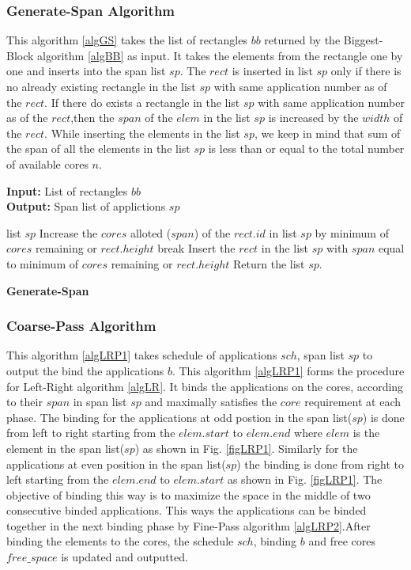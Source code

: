 \documentclass[10pt, conference]{IEEEtran}
\begin{document}
\subsubsection{Generate-Span Algorithm}
This algorithm \ref{algGS} takes the list of rectangles $bb$ returned by the Biggest-Block algorithm \ref{algBB} as input. It takes the elements from the rectangle one by one and inserts into the span list $sp$. The $rect$ is inserted in list $sp$ only if there is no already existing rectangle in the list $sp$ with same application number as of the $rect$. If there do exists a rectangle in the list $sp$ with same application number as of the $rect$,then the $span$ of the $elem$ in the list $sp$ is increased by the $width$ of the $rect$. While inserting the elements in the list $sp$, we keep in mind that sum of the span of all the elements in the list $sp$ is less than or equal to the total number of available cores $n$. 

\begin{algorithm}[tb]
\footnotesize
\textbf{Input:} List of rectangles $bb$\ \\
\textbf{Output:} Span list of applictions $sp$
\begin{algorithmic}[1]
\STATE list $sp$
			\STATE Increase the $cores$ alloted ($span$) of the $rect.id$ in list $sp$ by minimum of $cores$ remaining or $rect.height$
		\ELSE
			\STATE break
		\ENDIF
	\ELSE
		\STATE Insert the $rect$ in the list $sp$ with $span$ equal to minimum of $cores$ remaining or $rect.height$
	\ENDIF
\ENDFOR
\STATE Return the list $sp$.
\end{algorithmic}
\caption{\textbf{Generate-Span}}
\vspace{-0.1cm}
\label{algGS}
\end{algorithm}

\subsubsection{Coarse-Pass Algorithm}
This algorithm \ref{algLRP1} takes schedule of applications $sch$, span list $sp$ to output the bind the applications $b$. This algorithm \ref{algLRP1} forms the procedure for Left-Right algorithm \ref{algLR}. It binds the applications on the cores, according to their $span$ in span list $sp$ and maximally satisfies the $core$ requirement at each phase. The binding for the applications at odd postion in the span list($sp$) is done from left to right starting from the $elem.start$ to $elem.end$ where $elem$ is the element in the span list($sp$) as shown in Fig. \ref{figLRP1}. Similarly for the applications at even position in the span list($sp$) the binding is done from right to left starting from the $elem.end$ to $elem.start$ as shown in Fig. \ref{figLRP1}. The objective of binding this way is to maximize the space in the middle of two consecutive binded applications. This ways the applications can be binded together in the next binding phase by Fine-Pass algorithm \ref{algLRP2}.After binding the elements to the cores, the schedule $sch$, binding $b$ and free cores$free\_space$ is updated and outputted.
\end{document}
